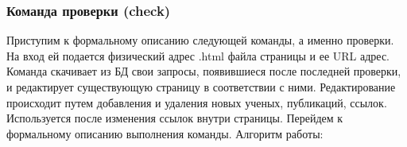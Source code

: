 \hypertarget{ux43aux43eux43cux430ux43dux434ux430-ux43fux440ux43eux432ux435ux440ux43aux438-check}{%
\subsubsection{Команда проверки
(check)}\label{ux43aux43eux43cux430ux43dux434ux430-ux43fux440ux43eux432ux435ux440ux43aux438-check}}

Приступим к формальному описанию следующей команды, а именно проверки.
На вход ей подается физический адрес .html файла страницы и ее URL
адрес. Команда скачивает из БД свои запросы, появившиеся после последней
проверки, и редактирует существующую страницу в соответствии с ними.
Редактирование происходит путем добавления и удаления новых ученых,
публикаций, ссылок. Используется после изменения ссылок внутри страницы.
Перейдем к формальному описанию выполнения команды. Алгоритм работы:

